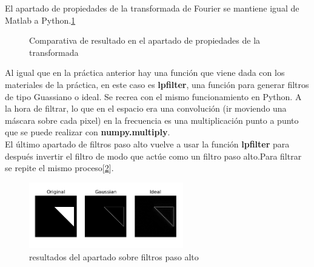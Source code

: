 \documentclass[a4paper,12pt]{report}
\begin{document}
El apartado de propiedades de la transformada de Fourier se mantiene igual de Matlab a Python.\ref{zoom}\\

\begin{figure}[!tbp]
  \centering
  \hfill
  \caption{Comparativa de resultado en el apartado de propiedades de la transformada}
  \label{zoom}
\end{figure}

Al igual que en la práctica anterior hay una función que viene dada con los materiales de la práctica, en este caso es  \textbf{lpfilter}, una función para generar filtros de tipo Guassiano o ideal. Se recrea con el mismo funcionamiento en Python. A la hora de filtrar, lo que en el espacio era una convolución (ir moviendo una máscara sobre cada pixel) en la frecuencia es una multiplicación punto a punto que se puede realizar con \textbf{numpy.multiply}.\\

El último apartado de filtros paso alto vuelve a usar la función \textbf{lpfilter} para después invertir el filtro de modo que actúe como un filtro paso alto.Para filtrar se repite el mismo proceso[\ref{fpa}].

\begin{figure}[h]
\centering
\includegraphics[width=0.6\textwidth]{imagenes/fpa}
\caption{resultados del apartado sobre filtros paso alto}
\label{fpa}
\end{figure}
\end{document}
